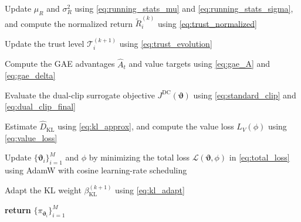 \documentclass[lettersize,journal]{IEEEtran}
\begin{document}
\begin{algorithm}[!t]
\begin{algorithmic}[1]
    \ENDFOR


    \STATE Update $\mu_R$ and $\sigma_R^2$ using
    \eqref{eq:running_stats_mu} and
    \eqref{eq:running_stats_sigma}, and compute the normalized
    return $\widetilde{R}_i^{(k)}$ using
    \eqref{eq:trust_normalized}

    \STATE Update the trust level
    $\mathcal{T}_i^{(k+1)}$ using
    \eqref{eq:trust_evolution}


    \STATE Compute the GAE advantages $\hat{A}_t$ and value targets
    using \eqref{eq:gae_A} and \eqref{eq:gae_delta}


        \STATE Evaluate the dual-clip surrogate objective
        $J^{\mathrm{DC}}(\boldsymbol{\vartheta})$ using
        \eqref{eq:standard_clip} and
        \eqref{eq:dual_clip_final}

        \STATE Estimate $\widehat{D}_{\mathrm{KL}}$ using
        \eqref{eq:kl_approx}, and compute the value loss
        $L_V(\phi)$ using \eqref{eq:value_loss}

        \STATE Update $\{\boldsymbol{\vartheta}_i\}_{i=1}^{M}$
        and $\phi$ by minimizing the total loss
        $\mathcal{L}(\boldsymbol{\vartheta},\phi)$ in
        \eqref{eq:total_loss} using AdamW with cosine
        learning-rate scheduling

    \ENDFOR

    \STATE Adapt the KL weight
    $\beta_{\mathrm{KL}}^{(k+1)}$ using
    \eqref{eq:kl_adapt}

\ENDFOR

\STATE \textbf{return}
$\{\pi_{\boldsymbol{\vartheta}_i}\}_{i=1}^{M}$

\end{algorithmic}
\end{algorithm}




\end{document}
